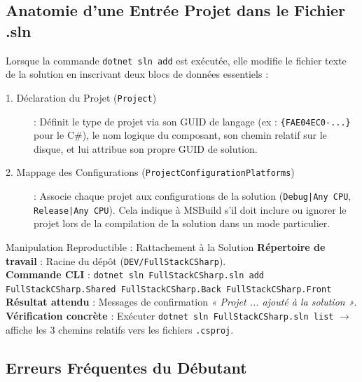 \newpage

\subsection*{Anatomie d'une Entrée Projet dans le Fichier .sln}

Lorsque la commande \texttt{dotnet sln add} est exécutée, elle modifie le fichier texte de la solution en inscrivant deux blocs de données essentiels :

\begin{description}
    \item[\color{secondary}1. Déclaration du Projet (\texttt{Project})] : Définit le type de projet via son GUID de langage (ex : \texttt{\{FAE04EC0-...\}} pour le C\#), le nom logique du composant, son chemin relatif sur le disque, et lui attribue son propre GUID de solution.
    \item[\color{cyanproj!90!black}2. Mappage des Configurations (\texttt{ProjectConfigurationPlatforms})] : Associe chaque projet aux configurations de la solution (\texttt{Debug|Any CPU}, \texttt{Release|Any CPU}). Cela indique à MSBuild s'il doit inclure ou ignorer le projet lors de la compilation de la solution dans un mode particulier.
\end{description}

\vspace{0.3cm}

\begin{bestpracticebox}{Manipulation Reproductible : Rattachement à la Solution}
\textbf{Répertoire de travail} : Racine du dépôt (\texttt{DEV/FullStackCSharp}).\\[2pt]
\textbf{Commande CLI} : \texttt{dotnet sln FullStackCSharp.sln add FullStackCSharp.Shared FullStackCSharp.Back FullStackCSharp.Front}\\[2pt]
\textbf{Résultat attendu} : Messages de confirmation \textit{« Projet ... ajouté à la solution »}.\\[2pt]
\textbf{Vérification concrète} : Exécuter \texttt{dotnet sln FullStackCSharp.sln list} $\longrightarrow$ affiche les 3 chemins relatifs vers les fichiers \texttt{.csproj}.
\end{bestpracticebox}

\vspace{0.2cm}

\subsection*{Erreurs Fréquentes du Débutant}

